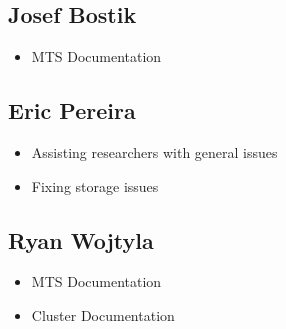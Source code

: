 \documentclass[12pt]{article}
\begin{document}
\subsection{Josef Bostik}

\begin{itemize}
\item MTS Documentation
\end{itemize}

\subsection{Eric Pereira}

\begin{itemize}
\item Assisting researchers with general issues
\item Fixing storage issues
\end{itemize}

\subsection{Ryan Wojtyla}

\begin{itemize}
\item MTS Documentation
\item Cluster Documentation 
\end{itemize}


\end{document}
